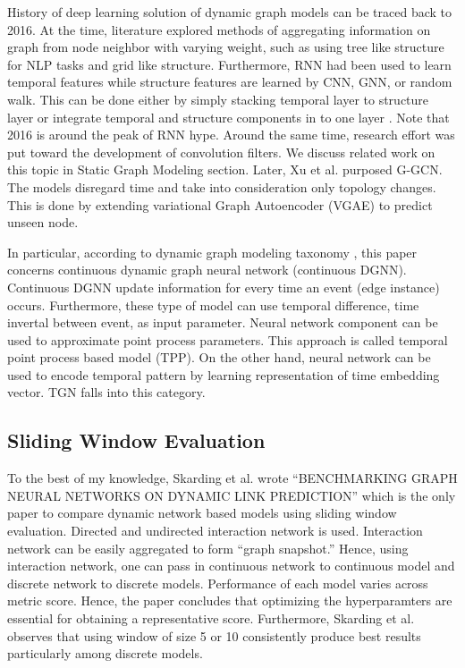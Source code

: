 \documentclass{IEEEtran}
\begin{document}
History of deep learning solution of dynamic graph models can be traced back to 2016. At the time, literature explored methods of aggregating information on graph from node neighbor with varying weight, such as using tree like structure for NLP tasks and grid like structure. Furthermore, RNN had been used to learn temporal features while structure features are learned by CNN, GNN, or random walk. This can be done either by simply stacking temporal layer to structure layer or integrate temporal and structure components in to one layer \cite{seo2018structured}. Note that 2016 is around the peak of RNN hype. Around the same time, research effort was put toward the development of convolution filters. We discuss related work on this topic in Static Graph Modeling section. Later, Xu et al. \cite{xu2019generative} purposed G-GCN. The models disregard time and take into consideration only topology changes. This is done by extending variational Graph Autoencoder (VGAE) \cite{kipf2016variational} to predict unseen node.

In particular, according to dynamic graph modeling taxonomy \cite{kazemiRepresentationLearningDynamica}, this paper concerns continuous dynamic graph neural network (continuous DGNN). Continuous DGNN update information for every time an event (edge instance) occurs. Furthermore, these type of model can use temporal difference, time invertal between event, as input parameter. Neural network component can be used to approximate point process parameters. This approach is called temporal point process based model (TPP). On the other hand, neural network can be used to encode temporal pattern by learning representation of time embedding vector. TGN falls into this category.
\subsection{Sliding Window Evaluation}
\label{sec:org73fc2fc}
To the best of my knowledge, Skarding et al. wrote ``BENCHMARKING GRAPH NEURAL NETWORKS ON DYNAMIC LINK PREDICTION'' \cite{skarding2021benchmarking} which is the only paper to compare dynamic network based models using sliding window evaluation. Directed and undirected interaction network is used. Interaction network can be easily aggregated to form ``graph snapshot.'' Hence, using interaction network, one can pass in continuous network to continuous model and discrete network to discrete models. Performance of each model varies across metric score. Hence, the paper concludes that optimizing the hyperparamters are essential for obtaining a representative score. Furthermore, Skarding et al. observes that using window of size 5 or 10 consistently produce best results particularly among discrete models.
\end{document}
